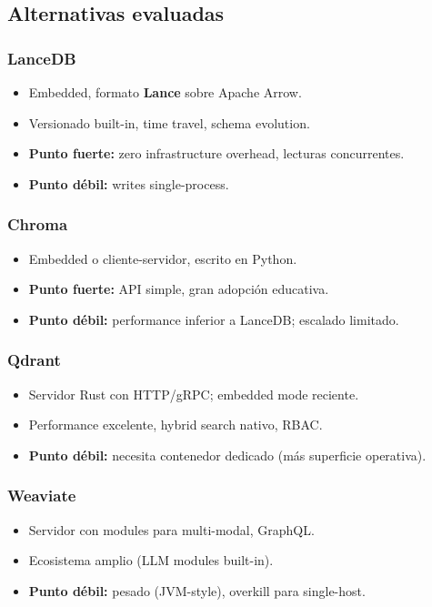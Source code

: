 \documentclass[11pt,a4paper]{article}
\begin{document}
\subsection{Alternativas evaluadas}

\subsubsection{LanceDB}
\begin{itemize}[leftmargin=*,itemsep=0pt]
\item Embedded, formato \textbf{Lance} sobre Apache Arrow.
\item Versionado built-in, time travel, schema evolution.
\item \textbf{Punto fuerte:} zero infrastructure overhead, lecturas concurrentes.
\item \textbf{Punto débil:} writes single-process.
\end{itemize}

\subsubsection{Chroma}
\begin{itemize}[leftmargin=*,itemsep=0pt]
\item Embedded o cliente-servidor, escrito en Python.
\item \textbf{Punto fuerte:} API simple, gran adopción educativa.
\item \textbf{Punto débil:} performance inferior a LanceDB; escalado limitado.
\end{itemize}

\subsubsection{Qdrant}
\begin{itemize}[leftmargin=*,itemsep=0pt]
\item Servidor Rust con HTTP/gRPC; embedded mode reciente.
\item Performance excelente, hybrid search nativo, RBAC.
\item \textbf{Punto débil:} necesita contenedor dedicado (más superficie operativa).
\end{itemize}

\subsubsection{Weaviate}
\begin{itemize}[leftmargin=*,itemsep=0pt]
\item Servidor con modules para multi-modal, GraphQL.
\item Ecosistema amplio (LLM modules built-in).
\item \textbf{Punto débil:} pesado (JVM-style), overkill para single-host.
\end{itemize}
\end{document}
